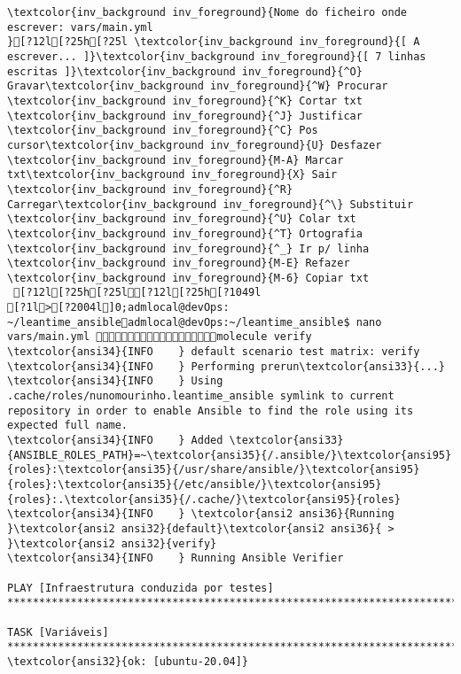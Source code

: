 \documentclass{scrartcl}
\begin{document}
\begin{Verbatim}
\textcolor{inv_background inv_foreground}{Nome do ficheiro onde escrever: vars/main.yml                                                                                             }[?12l[?25h[?25l \textcolor{inv_background inv_foreground}{[ A escrever... ]}\textcolor{inv_background inv_foreground}{[ 7 linhas escritas ]}\textcolor{inv_background inv_foreground}{^O} Gravar\textcolor{inv_background inv_foreground}{^W} Procurar      \textcolor{inv_background inv_foreground}{^K} Cortar txt    \textcolor{inv_background inv_foreground}{^J} Justificar    \textcolor{inv_background inv_foreground}{^C} Pos cursor\textcolor{inv_background inv_foreground}{U} Desfazer     \textcolor{inv_background inv_foreground}{M-A} Marcar txt\textcolor{inv_background inv_foreground}{X} Sair    \textcolor{inv_background inv_foreground}{^R} Carregar\textcolor{inv_background inv_foreground}{^\} Substituir    \textcolor{inv_background inv_foreground}{^U} Colar txt     \textcolor{inv_background inv_foreground}{^T} Ortografia    \textcolor{inv_background inv_foreground}{^_} Ir p/ linha   \textcolor{inv_background inv_foreground}{M-E} Refazer      \textcolor{inv_background inv_foreground}{M-6} Copiar txt
 [?12l[?25h[?25l[?12l[?25h[?1049l
[?1l>[?2004l]0;admlocal@devOps: ~/leantime_ansibleadmlocal@devOps:~/leantime_ansible$ nano vars/main.yml molecule verify
\textcolor{ansi34}{INFO    } default scenario test matrix: verify
\textcolor{ansi34}{INFO    } Performing prerun\textcolor{ansi33}{...}
\textcolor{ansi34}{INFO    } Using .cache/roles/nunomourinho.leantime_ansible symlink to current repository in order to enable Ansible to find the role using its expected full name.
\textcolor{ansi34}{INFO    } Added \textcolor{ansi33}{ANSIBLE_ROLES_PATH}=~\textcolor{ansi35}{/.ansible/}\textcolor{ansi95}{roles}:\textcolor{ansi35}{/usr/share/ansible/}\textcolor{ansi95}{roles}:\textcolor{ansi35}{/etc/ansible/}\textcolor{ansi95}{roles}:.\textcolor{ansi35}{/.cache/}\textcolor{ansi95}{roles}
\textcolor{ansi34}{INFO    } \textcolor{ansi2 ansi36}{Running }\textcolor{ansi2 ansi32}{default}\textcolor{ansi2 ansi36}{ > }\textcolor{ansi2 ansi32}{verify}
\textcolor{ansi34}{INFO    } Running Ansible Verifier

PLAY [Infraestrutura conduzida por testes] ***********************************************************************************************

TASK [Variáveis] *************************************************************************************************************************
\textcolor{ansi32}{ok: [ubuntu-20.04]}


\end{Verbatim}
\end{document}

